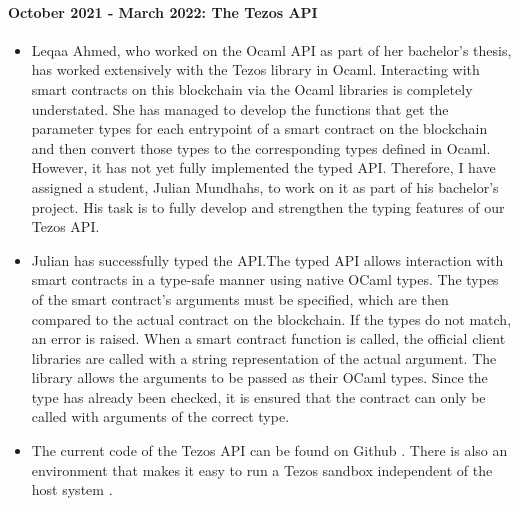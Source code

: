 \documentclass[a4paper,11pt]{article}
\begin{document}
\paragraph{October 2021 - March 2022: The Tezos API} 
\begin{itemize}
\item Leqaa Ahmed, who worked on the Ocaml API as part of her bachelor's thesis, has worked extensively with the Tezos library in Ocaml. Interacting with smart contracts on this blockchain via the Ocaml libraries is completely understated. She has managed to develop the functions that get the parameter types for each entrypoint of a smart contract on the blockchain and then convert those types to the corresponding types defined in Ocaml. However, it has not yet fully implemented the typed API. Therefore, I have assigned a student, Julian Mundhahs, to work on it as part of his bachelor's project. His task is to fully develop and strengthen the typing features of our Tezos API.
\item Julian has successfully typed the API.The typed API allows interaction with smart contracts in a type-safe manner using native OCaml types. The types of the smart contract's arguments must be specified, which are then compared to the actual contract on the blockchain. If the types do not match, an error is raised. When a smart contract function is called, the official client libraries are called with a string representation of the actual argument. The library allows the arguments to be passed as their OCaml types. Since the type has already been checked, it is ensured that the contract can only be called with arguments of the correct type. 
\item  The current code of the Tezos API can be found on Github \cite{tezos-api-update}. There is also an environment that makes it easy to run a Tezos sandbox independent of the host system \cite{tezos-api-devenv}.
\end{itemize}
 
\end{document}

